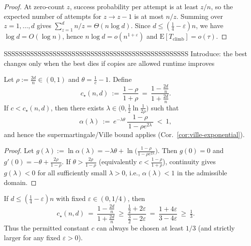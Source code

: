 \documentclass[lettersize,journal]{IEEEtran}
\newcommand{\EE}{\text{E}}
\begin{document}
\begin{proof}
	At zero-count $z$, success probability per attempt is at least $z/n$, so the expected number of attempts for $z\!\to\! z-1$ is at most $n/z$.
	Summing over $z=1,\dots,d$ gives $\sum_{z=1}^{d}n/z=\Theta(n\log d)$.
	Since $d\le(\tfrac14-\varepsilon)n$, we have $\log d=O(\log n)$, hence $n\log d=o(n^{1+\varepsilon})$ and $\EE[T_{\mathrm{climb}}]=o(\tau)$.
\end{proof}


SSSSSSSSSSSSSSSSSSSSSSSSSSSSSSSSSSSSSSSSSSSSSSSSS
Introduce: the best changes only when the best dies
if copies are allowed runtime improves

\begin{lemma}\label{lem:c-threshold-instance}
	Let $\rho:=\tfrac{2d}{n}\in(0,1)$ and $\theta=\tfrac{1}{c}-1$. Define
	\[
	c_\star(n,d)\ :=\ \frac{1-\rho}{1+\rho}\ =\ \frac{1-\tfrac{2d}{n}}{1+\tfrac{2d}{n}}.
	\]
	If $c<c_\star(n,d)$, then there exists $\lambda\in\!\big(0,\tfrac12\ln\tfrac{1}{2\rho}\big)$ such that
	\[
	\alpha(\lambda)\ :=\ e^{-\lambda\theta}\,\frac{1-\rho}{\,1-\rho e^{2\lambda}\,}\ <\ 1,
	\]
	and hence the supermartingale/Ville bound applies (Cor.~\ref{cor:ville-exponential}).
\end{lemma}

\begin{proof}
	Let $g(\lambda):=\ln\alpha(\lambda)=-\lambda\theta+\ln\!\big(\tfrac{1-\rho}{1-\rho e^{2\lambda}}\big)$. 
	Then $g(0)=0$ and $g'(0)=-\theta+\tfrac{2\rho}{1-\rho}$. 
	If $\theta>\tfrac{2\rho}{1-\rho}$ (equivalently $c<\tfrac{1-\rho}{1+\rho}$), continuity gives $g(\lambda)<0$ for all sufficiently small $\lambda>0$, i.e., $\alpha(\lambda)<1$ in the admissible domain.
\end{proof}

\begin{corollary}\label{cor:c-floor}
	If $d\le (\tfrac14-\varepsilon)n$ with fixed $\varepsilon\in(0,1/4)$, then
	\[
	c_\star(n,d)\ =\ \frac{1-\tfrac{2d}{n}}{1+\tfrac{2d}{n}}
	\ \ge\  \frac{\tfrac12+2\varepsilon}{\tfrac32-2\varepsilon}
	\ =\ \frac{1+4\varepsilon}{3-4\varepsilon}\ \ge\ \tfrac13.
	\]
	Thus the permitted constant $c$ can always be chosen at least $1/3$ (and strictly larger for any fixed $\varepsilon>0$).
\end{corollary}
\end{document}
